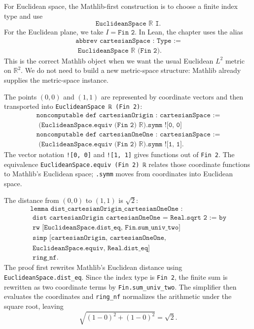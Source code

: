 \begin{example*}
For Euclidean space, the Mathlib-first construction is to choose a finite index
type and use
\[
  \texttt{EuclideanSpace ℝ I}.
\]
For the Euclidean plane, we take \(I = \texttt{Fin 2}\). In Lean, the chapter
uses the alias
\[
\begin{gathered}
  \texttt{abbrev cartesianSpace : Type :=}\\
  \texttt{\ \ EuclideanSpace ℝ (Fin 2).}
\end{gathered}
\]
This is the correct Mathlib object when we want the usual Euclidean \(L^2\)
metric on \(\mathbb{R}^2\). We do not need to build a new metric-space
structure: Mathlib already supplies the metric-space instance.
\end{example*}

\begin{remark*}
The points \((0,0)\) and \((1,1)\) are represented by coordinate vectors and
then transported into \texttt{EuclideanSpace ℝ (Fin 2)}:
\[
\begin{gathered}
  \texttt{noncomputable def cartesianOrigin : cartesianSpace :=}\\
  \texttt{\ \ (EuclideanSpace.equiv (Fin 2) ℝ).symm ![0, 0]}\\
  \texttt{noncomputable def cartesianOneOne : cartesianSpace :=}\\
  \texttt{\ \ (EuclideanSpace.equiv (Fin 2) ℝ).symm ![1, 1].}
\end{gathered}
\]
The vector notation \texttt{![0, 0]} and \texttt{![1, 1]} gives functions out
of \texttt{Fin 2}. The equivalence \texttt{EuclideanSpace.equiv (Fin 2) ℝ}
relates those coordinate functions to Mathlib's Euclidean space; \texttt{.symm}
moves from coordinates into Euclidean space.
\end{remark*}

\begin{example*}
The distance from \((0,0)\) to \((1,1)\) is \(\sqrt{2}\):
\[
\begin{gathered}
  \texttt{lemma dist\_cartesianOrigin\_cartesianOneOne :}\\
  \texttt{\ \ dist cartesianOrigin cartesianOneOne = Real.sqrt 2 := by}\\
  \texttt{\ \ rw [EuclideanSpace.dist\_eq, Fin.sum\_univ\_two]}\\
  \texttt{\ \ simp [cartesianOrigin, cartesianOneOne,}\\
  \texttt{\ \ \ \ EuclideanSpace.equiv, Real.dist\_eq]}\\
  \texttt{\ \ ring\_nf.}
\end{gathered}
\]
The proof first rewrites Mathlib's Euclidean distance using
\texttt{EuclideanSpace.dist\_eq}. Since the index type is \texttt{Fin 2}, the
finite sum is rewritten as two coordinate terms by
\texttt{Fin.sum\_univ\_two}. The simplifier then evaluates the coordinates and
\texttt{ring\_nf} normalizes the arithmetic under the square root, leaving
\[
  \sqrt{(1-0)^2 + (1-0)^2} = \sqrt{2}.
\]
\end{example*}

